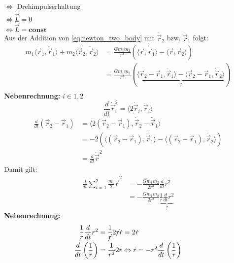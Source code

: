 \begin{description}
        $\Leftrightarrow$ Drehimpulserhaltung\\
        $\Leftrightarrow \dot{\vec{L}} = 0$\\
        $\Leftrightarrow \dot{\vec{L}} = \textbf{const}$\\
        Aus der Addition von \autoref{eq:newton_two_body} mit $\dot\vec{r}_2$ bzw. $\dot\vec{r}_1$ folgt:
        \begin{align*}
            m_1 \langle\dot{\vec{r}}_1, \ddot{\vec{r}}_1\rangle + m_2 \langle\dot{\vec{r}}_2, \ddot{\vec{r}}_2\rangle 
                &= \frac{Gm_1m_2}{r^3} \left(\langle\vec{r}, \dot\vec{r}_1\rangle - \langle\vec{r}, \dot\vec{r}_2\rangle\right)\\
                &= \frac{Gm_1m_2}{r^3} (\underbrace{\langle\vec{r}_2 - \vec{r}_1, \dot\vec{r}_1\rangle - \langle\vec{r}_2 - \vec{r}_1, \dot\vec{r}_2\rangle}_{?})\\
        \end{align*}
        \color{OliveGreen}
        \textbf{Nebenrechnung:} $i \in {1,2}$
        \[\frac{d}{dt}\dot{\vec{r}}_i^2 = \langle2\dot{\vec{r}}_i, \ddot{\vec{r}}_i\rangle \tag{Kettenregel}\]
        \color{black}
        \begin{align*}
            \frac{d}{dt}(\vec{r}_2 - \vec{r}_1) &= \langle2(\vec{r}_2 - \vec{r}_1), \dot{\vec{r}}_2 - \dot\vec{r}_1\rangle\\ 
                                                &= -2 \left(\langle(\vec{r}_2 - \vec{r}_1), \dot{\vec{r}}_1\rangle - \langle(\vec{r}_2 - \vec{r}_1), \dot\vec{r}_2\rangle\right)\\
                                                &= \frac{d}{dt} \dot\vec r^2
        \end{align*}
        Damit gilt:
        \begin{align*}
            \frac{d}{dt} \sum\limits_{i = 1}^{2} \frac{m_i}{2} \dot\vec r^2 &= -\frac{Gm_1m_2}{2r^3} \frac{d}{dt} r^2\\
                                                                        &= -\frac{Gm_1m_2}{2r^2} \underbrace{\frac{1}{r} \frac{d}{dt} r^2}_{?} \tag{skalare Gleichung}
        \end{align*}
        \color{OliveGreen}
        \textbf{Nebenrechnung:}
        \begin{align}
            \frac{1}{r} \frac{d}{dt} r^2            &= \frac{1}{\cancel{r}} 2 \cancel{r} \dot{r} = 2 \dot{r} \label{eq:newton_nr_1}\\
            \frac{d}{dt} \left(\frac{1}{r}\right)   &= \frac{1}{r^2} 2 \dot{r} \Leftrightarrow \dot{r} = -r^2 \frac{d}{dt} \left(\frac{1}{r}\right) \label{eq:newton_nr_2}\\

\end{align}
\end{description}
